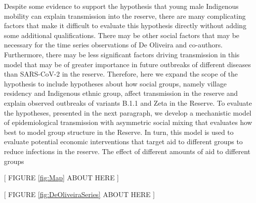 \documentclass[
  letterpaper,
  abstract]{scrartcl}
\begin{document}
Despite some evidence to support the hypothesis that young male
Indigenous mobility can explain transmission into the reserve, there are
many complicating factors that make it difficult to evaluate this
hypothesis directly without adding some additional qualifications. 
There
may be other social factors that may be necessary for the time series
observations of De Oliveira and co-authors. 
Furthermore, there may be
less significant factors driving transmission in this model that may be
of greater importance in future outbreaks of different diseases than
SARS-CoV-2 in the reserve. 
Therefore, here we expand the scope of the
hypothesis to include hypotheses about how social groups, namely village
residency and Indigenous ethnic group, affect transmission in the
reserve and explain observed outbreaks of variants B.1.1 and Zeta in the
Reserve. To evaluate the hypotheses, presented in the next paragraph, we
develop a mechanistic model of epidemiological transmission with
asymmetric social mixing that evaluates how best to model group
structure in the Reserve. In turn, this model is used to evaluate
potential economic interventions that target aid to different groups to
reduce infections in the reserve. The effect of different amounts of aid to
different groups 
\vspace{0.5em}
\begin{center}
{[ FIGURE \ref{fig:Map} ABOUT HERE ]} \\
\end{center}

\vspace{0.5em}
\begin{center}
{[ FIGURE \ref{fig:DeOliveiraSeries} ABOUT HERE ]} \\
\end{center}
\end{document}
